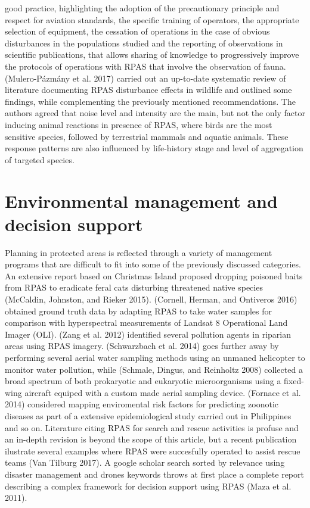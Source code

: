 \documentclass[]{interact}
\theoremstyle{plain}%
\theoremstyle{definition}
\theoremstyle{remark}
\begin{document}
good practice, highlighting the adoption of the precautionary principle
and respect for aviation standards, the specific training of operators,
the appropriate selection of equipment, the cessation of operations in
the case of obvious disturbances in the populations studied and the
reporting of observations in scientific publications, that allows
sharing of knowledge to progressively improve the protocols of
operations with RPAS that involve the observation of fauna.
(Mulero-Pázmány et al. 2017) carried out an up-to-date systematic review
of literature documenting RPAS disturbance effects in wildlife and
outlined some findings, while complementing the previously mentioned
recommendations. The authors agreed that noise level and intensity are
the main, but not the only factor inducing animal reactions in presence
of RPAS, where birds are the most sensitive species, followed by
terrestrial mammals and aquatic animals. These response patterns are
also influenced by life-history stage and level of aggregation of
targeted species.

\section{Environmental management and decision
support}\label{environmental-management-and-decision-support}

Planning in protected areas is reflected through a variety of management
programs that are difficult to fit into some of the previously discussed
categories. An extensive report based on Christmas Island proposed
dropping poisoned baits from RPAS to eradicate feral cats disturbing
threatened native species (McCaldin, Johnston, and Rieker 2015).
(Cornell, Herman, and Ontiveros 2016) obtained ground truth data by
adapting RPAS to take water samples for comparison with hyperspectral
measurements of Landsat 8 Operational Land Imager (OLI). (Zang et al.
2012) identified several pollution agents in riparian areas using RPAS
imagery. (Schwarzbach et al. 2014) goes further away by performing
several aerial water sampling methods using an unmaned helicopter to
monitor water pollution, while (Schmale, Dingus, and Reinholtz 2008)
collected a broad spectrum of both prokaryotic and eukaryotic
microorganisms using a fixed-wing aircraft equiped with a custom made
aerial sampling device. (Fornace et al. 2014) considered mapping
enviromental risk factors for predicting zoonotic diseases as part of a
extensive epidemiological study carried out in Philippines and so on.
Literature citing RPAS for search and rescue activities is profuse and
an in-depth revision is beyond the scope of this article, but a recent
publication ilustrate several examples where RPAS were succesfully
operated to assist rescue teams (Van Tilburg 2017). A google scholar
search sorted by relevance using disaster management and drones keywords
throws at first place a complete report describing a complex framework
for decision support using RPAS (Maza et al. 2011).
\end{document}
